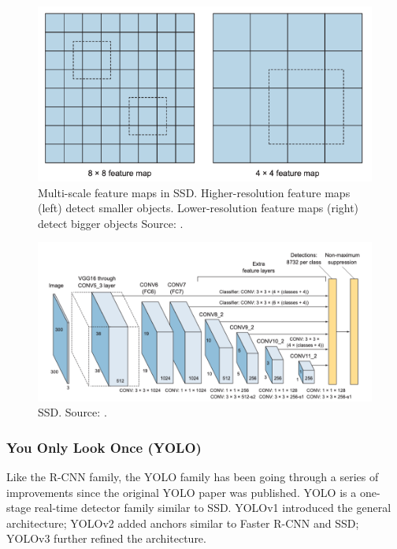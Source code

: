 \documentclass[a4paper, 11pt, oneside]{article}
\begin{document}
\begin{figure}[ht]
  \begin{center}
    \includegraphics[width=.8\textwidth]{ssd_feature_maps.png}
  \end{center}
  \caption{Multi-scale feature maps in SSD. Higher-resolution feature maps (left) detect smaller objects.
  Lower-resolution feature maps (right) detect bigger objects Source: \cite{elgendy2020deep}.}
\end{figure}

\begin{figure}[ht]
  \begin{center}
    \includegraphics[width=.8\textwidth]{ssd.png}
  \end{center}
  \caption{SSD. Source: \cite{elgendy2020deep}.}
\end{figure}

\subsubsection{You Only Look Once (YOLO)}

Like the R-CNN family, the YOLO family has been going through a series of improvements since the original YOLO paper
was published. YOLO is a one-stage real-time detector family similar to SSD. YOLOv1 \cite{redmon2016you} introduced the
general architecture; YOLOv2 \cite{redmon2017yolo9000} added anchors similar to Faster R-CNN and SSD; YOLOv3
\cite{redmon2018yolov3} further refined the architecture.
\end{document}

